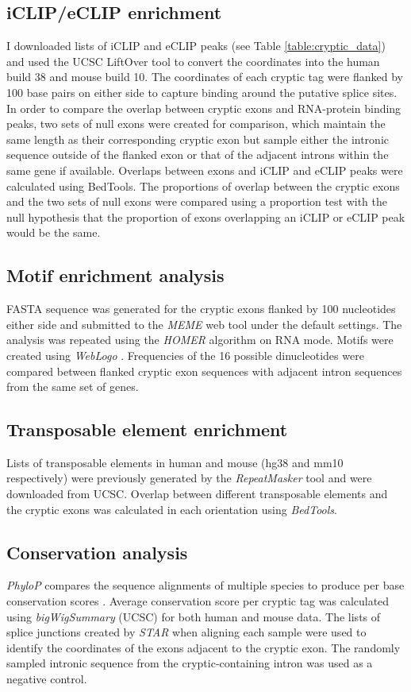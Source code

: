 \subsection{iCLIP/eCLIP enrichment}

I downloaded lists of iCLIP and eCLIP peaks (see Table \ref{table:cryptic_data}) and used the UCSC LiftOver tool to convert the coordinates into the human build 38 and mouse build 10.
The coordinates of each cryptic tag were flanked by 100 base pairs on either side to capture binding around the putative splice sites. In order to compare the overlap between cryptic exons and RNA-protein binding peaks, two sets of null exons were created for comparison, which maintain the same length as their corresponding cryptic exon but sample either the intronic sequence outside of the flanked exon or that of the adjacent introns within the same gene if available. Overlaps between exons and iCLIP and eCLIP peaks were calculated using BedTools. The proportions of overlap between the cryptic exons and the two sets of null exons were compared using a proportion test with the null hypothesis that the proportion of exons overlapping an iCLIP or eCLIP peak would be the same.

\subsection{Motif enrichment analysis}
FASTA sequence was generated for the cryptic exons flanked by 100 nucleotides either side and submitted to the \emph{MEME} web tool \citep{Bailey2009-lw} under the default settings. The analysis was repeated using the \emph{HOMER} algorithm \citep{Heinz2010-ym} on RNA mode. Motifs were created using \emph{WebLogo} \citep{Crooks2004-yg}. Frequencies of the 16 possible dinucleotides were compared between flanked cryptic exon sequences with adjacent intron sequences from the same set of genes.

\subsection{Transposable element enrichment} 
Lists of transposable elements in human and mouse (hg38 and mm10 respectively) were previously generated by the \emph{RepeatMasker} tool \citep{Smit_AFA_Hubley_R_Green_P2015-ye} and were downloaded from UCSC. Overlap between different transposable elements and the cryptic exons was calculated in each orientation using \emph{BedTools}. 

\subsection{Conservation analysis}
\textit{PhyloP} compares the sequence alignments of multiple species to produce per base conservation scores \citep{Pollard2010-fj}. Average conservation score per cryptic tag was calculated using \emph{bigWigSummary} (UCSC) for both human and mouse data. The lists of splice junctions created by \emph{STAR} when aligning each sample were used to identify the coordinates of the exons adjacent to the cryptic exon. The randomly sampled intronic sequence from the cryptic-containing intron was used as a negative control.

